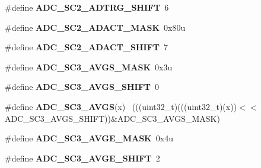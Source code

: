 \begin{DoxyCompactItemize}
\item 
\hypertarget{group___a_d_c___register___masks_gaaf095f7499b92bc748f7fa7c0aaa8bc1}{}\#define {\bfseries A\+D\+C\+\_\+\+S\+C2\+\_\+\+A\+D\+T\+R\+G\+\_\+\+S\+H\+I\+F\+T}~6\label{group___a_d_c___register___masks_gaaf095f7499b92bc748f7fa7c0aaa8bc1}

\item 
\hypertarget{group___a_d_c___register___masks_gad053a37ef205c8611605d1dc4e89bf8d}{}\#define {\bfseries A\+D\+C\+\_\+\+S\+C2\+\_\+\+A\+D\+A\+C\+T\+\_\+\+M\+A\+S\+K}~0x80u\label{group___a_d_c___register___masks_gad053a37ef205c8611605d1dc4e89bf8d}

\item 
\hypertarget{group___a_d_c___register___masks_ga0e05ad49280a025a87a91279caaf7403}{}\#define {\bfseries A\+D\+C\+\_\+\+S\+C2\+\_\+\+A\+D\+A\+C\+T\+\_\+\+S\+H\+I\+F\+T}~7\label{group___a_d_c___register___masks_ga0e05ad49280a025a87a91279caaf7403}

\item 
\hypertarget{group___a_d_c___register___masks_ga677b69b096f22ecc80fff1a789d3c48d}{}\#define {\bfseries A\+D\+C\+\_\+\+S\+C3\+\_\+\+A\+V\+G\+S\+\_\+\+M\+A\+S\+K}~0x3u\label{group___a_d_c___register___masks_ga677b69b096f22ecc80fff1a789d3c48d}

\item 
\hypertarget{group___a_d_c___register___masks_gad00e65ae5553df8fbeef6430a61d2f74}{}\#define {\bfseries A\+D\+C\+\_\+\+S\+C3\+\_\+\+A\+V\+G\+S\+\_\+\+S\+H\+I\+F\+T}~0\label{group___a_d_c___register___masks_gad00e65ae5553df8fbeef6430a61d2f74}

\item 
\hypertarget{group___a_d_c___register___masks_ga8262f4d59481660caf360cdb5739d30f}{}\#define {\bfseries A\+D\+C\+\_\+\+S\+C3\+\_\+\+A\+V\+G\+S}(x)                                                ~(((uint32\+\_\+t)(((uint32\+\_\+t)(x))$<$$<$A\+D\+C\+\_\+\+S\+C3\+\_\+\+A\+V\+G\+S\+\_\+\+S\+H\+I\+F\+T))\&A\+D\+C\+\_\+\+S\+C3\+\_\+\+A\+V\+G\+S\+\_\+\+M\+A\+S\+K)\label{group___a_d_c___register___masks_ga8262f4d59481660caf360cdb5739d30f}

\item 
\hypertarget{group___a_d_c___register___masks_gafcb3a8cfe1a126545673ddcf733b74da}{}\#define {\bfseries A\+D\+C\+\_\+\+S\+C3\+\_\+\+A\+V\+G\+E\+\_\+\+M\+A\+S\+K}~0x4u\label{group___a_d_c___register___masks_gafcb3a8cfe1a126545673ddcf733b74da}

\item 
\hypertarget{group___a_d_c___register___masks_ga56d9621785ea853cf450f1b06d15e1d5}{}\#define {\bfseries A\+D\+C\+\_\+\+S\+C3\+\_\+\+A\+V\+G\+E\+\_\+\+S\+H\+I\+F\+T}~2\label{group___a_d_c___register___masks_ga56d9621785ea853cf450f1b06d15e1d5}


\end{DoxyCompactItemize}
